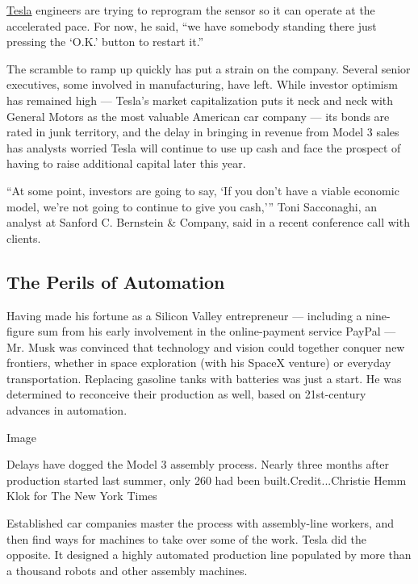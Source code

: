 \href{https://www.nytimes3xbfgragh.onion/2020/07/02/business/tesla-sales-second-quarter.html}{Tesla}
engineers are trying to reprogram the sensor so it can operate at the
accelerated pace. For now, he said, ``we have somebody standing there
just pressing the `O.K.' button to restart it.''

The scramble to ramp up quickly has put a strain on the company. Several
senior executives, some involved in manufacturing, have left. While
investor optimism has remained high --- Tesla's market capitalization
puts it neck and neck with General Motors as the most valuable American
car company --- its bonds are rated in junk territory, and the delay in
bringing in revenue from Model 3 sales has analysts worried Tesla will
continue to use up cash and face the prospect of having to raise
additional capital later this year.

``At some point, investors are going to say, `If you don't have a viable
economic model, we're not going to continue to give you cash,''' Toni
Sacconaghi, an analyst at Sanford C. Bernstein \& Company, said in a
recent conference call with clients.

\hypertarget{the-perils-of-automation}{%
\subsection{The Perils of Automation}\label{the-perils-of-automation}}

Having made his fortune as a Silicon Valley entrepreneur --- including a
nine-figure sum from his early involvement in the online-payment service
PayPal --- Mr. Musk was convinced that technology and vision could
together conquer new frontiers, whether in space exploration (with his
SpaceX venture) or everyday transportation. Replacing gasoline tanks
with batteries was just a start. He was determined to reconceive their
production as well, based on 21st-century advances in automation.

Image

Delays have dogged the Model 3 assembly process. Nearly three months
after production started last summer, only 260 had been
built.Credit...Christie Hemm Klok for The New York Times

Established car companies master the process with assembly-line workers,
and then find ways for machines to take over some of the work. Tesla did
the opposite. It designed a highly automated production line populated
by more than a thousand robots and other assembly machines.

